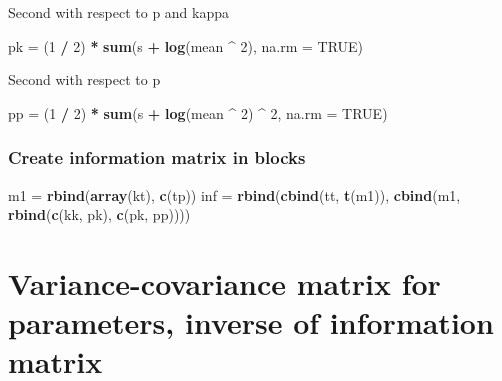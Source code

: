 \documentclass[]{article}
\newenvironment{Shaded}{\begin{snugshade}}{\end{snugshade}}
\newcommand{\DataTypeTok}[1]{\textcolor[rgb]{0.13,0.29,0.53}{#1}}
\newcommand{\DecValTok}[1]{\textcolor[rgb]{0.00,0.00,0.81}{#1}}
\newcommand{\KeywordTok}[1]{\textcolor[rgb]{0.13,0.29,0.53}{\textbf{#1}}}
\newcommand{\NormalTok}[1]{#1}
\newcommand{\OperatorTok}[1]{\textcolor[rgb]{0.81,0.36,0.00}{\textbf{#1}}}
\newcommand{\OtherTok}[1]{\textcolor[rgb]{0.56,0.35,0.01}{#1}}
\newcommand{\StringTok}[1]{\textcolor[rgb]{0.31,0.60,0.02}{#1}}
\begin{document}
Second with respect to p and kappa

\begin{Shaded}
\begin{Highlighting}[]
\NormalTok{pk =}\StringTok{ }\NormalTok{(}\DecValTok{1} \OperatorTok{/}\StringTok{ }\DecValTok{2}\NormalTok{) }\OperatorTok{*}\StringTok{ }\KeywordTok{sum}\NormalTok{(s }\OperatorTok{+}\StringTok{ }\KeywordTok{log}\NormalTok{(mean }\OperatorTok{^}\StringTok{ }\DecValTok{2}\NormalTok{), }\DataTypeTok{na.rm =} \OtherTok{TRUE}\NormalTok{)}
\end{Highlighting}
\end{Shaded}

Second with respect to p

\begin{Shaded}
\begin{Highlighting}[]
\NormalTok{pp =}\StringTok{ }\NormalTok{(}\DecValTok{1} \OperatorTok{/}\StringTok{ }\DecValTok{2}\NormalTok{) }\OperatorTok{*}\StringTok{ }\KeywordTok{sum}\NormalTok{(s }\OperatorTok{+}\StringTok{ }\KeywordTok{log}\NormalTok{(mean }\OperatorTok{^}\StringTok{ }\DecValTok{2}\NormalTok{) }\OperatorTok{^}\StringTok{ }\DecValTok{2}\NormalTok{, }\DataTypeTok{na.rm =} \OtherTok{TRUE}\NormalTok{)}
\end{Highlighting}
\end{Shaded}

\hypertarget{create-information-matrix-in-blocks}{%
\subsubsection{Create information matrix in
blocks}\label{create-information-matrix-in-blocks}}

\begin{Shaded}
\begin{Highlighting}[]
\NormalTok{m1 =}\StringTok{ }\KeywordTok{rbind}\NormalTok{(}\KeywordTok{array}\NormalTok{(kt), }\KeywordTok{c}\NormalTok{(tp))}
\NormalTok{inf =}\StringTok{ }\KeywordTok{rbind}\NormalTok{(}\KeywordTok{cbind}\NormalTok{(tt, }\KeywordTok{t}\NormalTok{(m1)), }\KeywordTok{cbind}\NormalTok{(m1, }\KeywordTok{rbind}\NormalTok{(}\KeywordTok{c}\NormalTok{(kk, pk), }\KeywordTok{c}\NormalTok{(pk, pp))))}
\end{Highlighting}
\end{Shaded}

\hypertarget{variance-covariance-matrix-for-parameters-inverse-of-information-matrix}{%
\section{Variance-covariance matrix for parameters, inverse of
information
matrix}\label{variance-covariance-matrix-for-parameters-inverse-of-information-matrix}}
\end{document}

